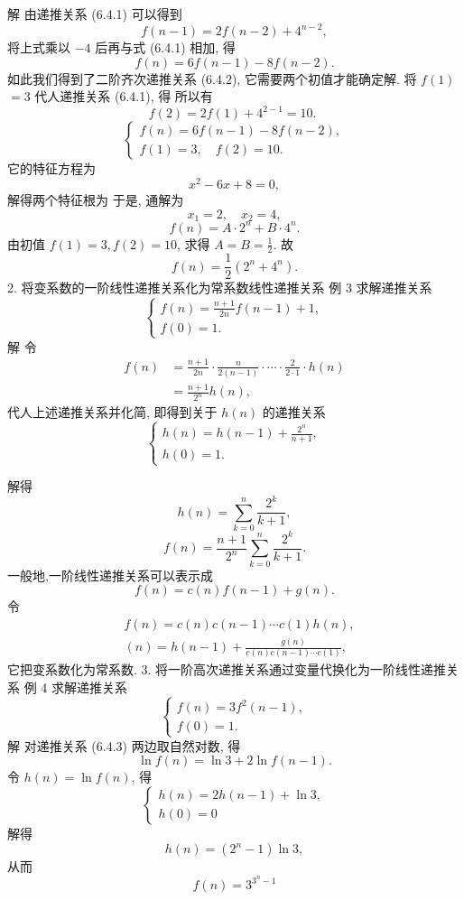 \documentclass{report}
\begin{document}
解 由递推关系 (6.4.1) 可以得到
$$
f(n-1)=2 f(n-2)+4^{n-2},
$$
将上式乘以 $-4$ 后再与式 (6.4.1) 相加, 得
$$
f(n)=6 f(n-1)-8 f(n-2) .
$$
如此我们得到了二阶齐次递推关系 (6.4.2), 它需要两个初值才能确定解. 将 $f(1)$ $=3$ 代人递推关系 (6.4.1), 得
所以有
$$
f(2)=2 f(1)+4^{2-1}=10 \text {. }
$$
$$
\left\{\begin{array}{l}
	f(n)=6 f(n-1)-8 f(n-2), \\
	f(1)=3, \quad f(2)=10 .
\end{array}\right.
$$
它的特征方程为
$$
x^2-6 x+8=0,
$$
解得两个特征根为
于是, 通解为
$$
x_1=2, \quad x_2=4,
$$
$$
f(n)=A \cdot 2^n+B \cdot 4^n .
$$
由初值 $f(1)=3, f(2)=10$, 求得 $A=B=\frac{1}{2}$. 故
$$
f(n)=\frac{1}{2}\left(2^n+4^n\right) .
$$
2. 将变系数的一阶线性递推关系化为常系数线性递推关系
例 3 求解递推关系
$$
\left\{\begin{array}{l}
	f(n)=\frac{n+1}{2 n} f(n-1)+1, \\
	f(0)=1 .
\end{array}\right.
$$
解 令
$$
\begin{aligned}
	f(n) &=\frac{n+1}{2 n} \cdot \frac{n}{2(n-1)} \cdot \cdots \cdot \frac{2}{2 \cdot 1} \cdot h(n) \\
	&=\frac{n+1}{2^n} h(n),
\end{aligned}
$$
代人上述递推关系并化简, 即得到关于 $h(n)$ 的递推关系
$$
\left\{\begin{array}{l}
	h(n)=h(n-1)+\frac{2^n}{n+1}, \\
	h(0)=1 .
\end{array}\right.
$$

解得
$$
h(n)=\sum_{k=0}^n \frac{2^k}{k+1},
$$
$$
f(n)=\frac{n+1}{2^n} \sum_{k=0}^n \frac{2^k}{k+1} .
$$
一般地,一阶线性递推关系可以表示成
$$
f(n)=c(n) f(n-1)+g(n) .
$$
令
$$
\begin{aligned}
	&f(n)=c(n) c(n-1) \cdots c(1) h(n), \\
	&(n)=h(n-1)+\frac{g(n)}{c(n) c(n-1) \cdots c(1)},
\end{aligned}
$$
它把变系数化为常系数.
3. 将一阶高次递推关系通过变量代换化为一阶线性递推关系
例 4 求解递推关系
$$
\left\{\begin{array}{l}
	f(n)=3 f^2(n-1), \\
	f(0)=1 .
\end{array}\right.
$$
解 对递推关系 (6.4.3) 两边取自然对数, 得
$$
\ln f(n)=\ln 3+2 \ln f(n-1) .
$$
令 $h(n)=\ln f(n)$, 得
$$
\left\{\begin{array}{l}
	h(n)=2 h(n-1)+\ln 3, \\
	h(0)=0
\end{array}\right.
$$
解得
$$
h(n)=\left(2^n-1\right) \ln 3,
$$
从而
$$
f(n)=3^{3^n-1}
$$
\end{document}
